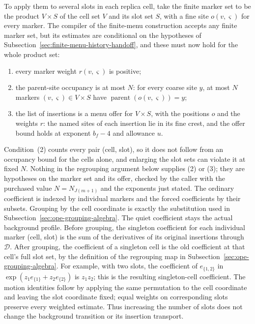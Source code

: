 To apply them to several slots in each replica cell, take the finite
marker set to be the product $V\times S$ of the cell set $V$ and its slot
set $S$, with a fine site $o(v,\varsigma)$ for every marker. The
compiler of the finite-menu construction accepts any finite marker set,
but its estimates are conditional on the hypotheses of
Subsection~\ref{sec:finite-menu-history-handoff}, and these must now hold
for the whole product set:
\begin{enumerate}
\item every marker weight $r(v,\varsigma)$ is positive;
\item the parent-site occupancy is at most $N$: for every coarse site
 $y$, at most $N$ markers $(v,\varsigma)\in V\times S$ have
 $\operatorname{parent}(o(v,\varsigma))=y$;
\item the list of insertions is a menu offer for $V\times S$, with the
 positions $o$ and the weights $r$: the named sites of each insertion lie
 in its fine crest, and the offer bound holds at exponent $b_f-4$ and
 allowance $u$.
\end{enumerate}
Condition~(2) counts every pair (cell, slot), so it does not follow from
an occupancy bound for the cells alone, and enlarging the slot sets can
violate it at fixed $N$. Nothing in the regrouping argument below
supplies (2) or (3); they are hypotheses on the marker set and its offer,
checked by the caller with the purchased value $N=N_{J(m+1)}$ and the
exponents just stated. The ordinary coefficient is indexed by individual
markers and the forced coefficients by their subsets. Grouping by
the cell coordinate is exactly the substitution used in
Subsection~\ref{sec:ope-grouping-algebra}. The quiet coefficient stays
the actual background profile. Before grouping, the singleton coefficient
for each individual marker (cell, slot) is the sum of the derivatives
of its original insertions through $\mathcal D$. After grouping,
the coefficient of a singleton cell is the old coefficient at that
cell's full slot set, by the definition of the regrouping map in
Subsection~\ref{sec:ope-grouping-algebra}. For example, with two slots,
the coefficient of $e_{\{1,2\}}$ in
$\exp(z_1e_{\{1\}}+z_2e_{\{2\}})$ is $z_1z_2$;
this is the resulting singleton-cell coefficient. The motion identities
follow by applying the same
permutation to the cell coordinate and leaving the slot coordinate
fixed; equal weights on corresponding slots preserve every weighted
estimate. Thus increasing the number of slots does not change the
background transition or its insertion transport.

